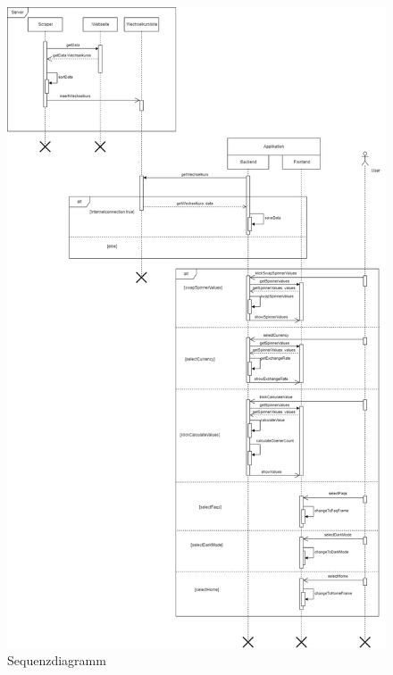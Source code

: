 \documentclass[conference]{IEEEtran}
\begin{document}
\begin{figure}[h]
	\centering
	\includegraphics[width=1\linewidth, frame]{Sequenzdiagramm.drawio}
	\caption[Sequenzdiagramm]{Sequenzdiagramm}
	\label{fig:sequenzdiagramm}
\end{figure}
\noindent
\end{document}
